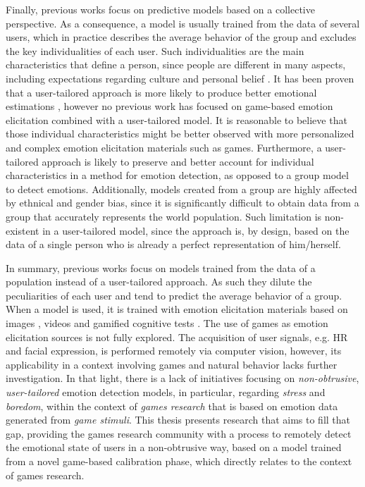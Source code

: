 Finally, previous works focus on predictive models based on a collective perspective. As a consequence, a model is usually trained from the data of several users, which in practice describes the average behavior of the group and excludes the key individualities of each user. Such individualities are the main characteristics that define a person, since people are different in many aspects, including expectations regarding culture and personal belief \parencite{goldberg1993structure}. It has been proven that a user-tailored approach is more likely to produce better emotional estimations \parencite{bailenson2008real}, however no previous work has focused on game-based emotion elicitation combined with a user-tailored model. It is reasonable to believe that those individual characteristics might be better observed with more personalized and complex emotion elicitation materials such as games. Furthermore, a user-tailored approach is likely to preserve and better account for individual characteristics in a method for emotion detection, as opposed to a group model to detect emotions. Additionally, models created from a group are highly affected by ethnical and gender bias, since it is significantly difficult to obtain data from a group that accurately represents the world population. Such limitation is non-existent in a user-tailored model, since the approach is, by design, based on the data of a single person who is already a perfect representation of him/herself.

In summary, previous works focus on models trained from the data of a population instead of a user-tailored approach. As such they dilute the peculiarities of each user and tend to predict the average behavior of a group. When a model is used, it is trained with emotion elicitation materials based on images \parencite{giannakakis2017stress,anttonen2005emotions}, videos \parencite{bailenson2008real,grundlehner2009design} and gamified cognitive tests \parencite{mcduff2014remote,mcduffcogcam}. The use of games as emotion elicitation sources is not fully explored. The acquisition of user signals, e.g. HR and facial expression, is performed remotely via computer vision, however, its applicability in a context involving games and natural behavior lacks further investigation. In that light, there is a lack of initiatives focusing on \textit{non-obtrusive}, \textit{user-tailored} emotion detection models, in particular, regarding \textit{stress} and \textit{boredom}, within the context of \textit{games research} that is based on emotion data generated from \textit{game stimuli}. This thesis presents research that aims to fill that gap, providing the games research community with a process to remotely detect the emotional state of users in a non-obtrusive way, based on a model trained from a novel game-based calibration phase, which directly relates to the context of games research.

